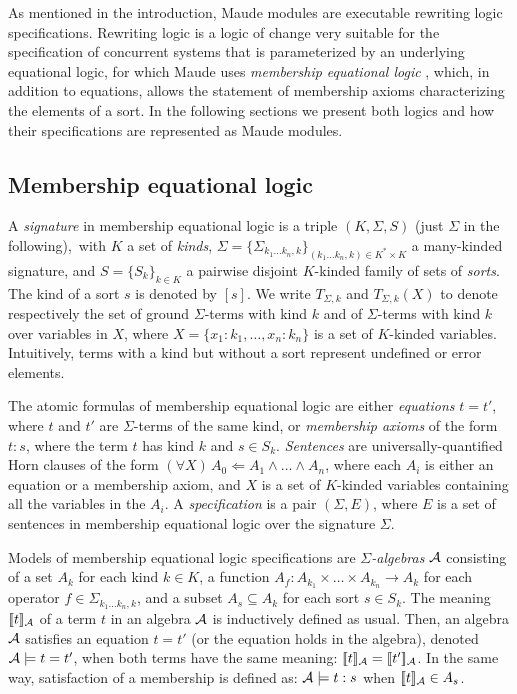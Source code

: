 
As mentioned in the introduction, Maude modules are executable rewriting logic specifications.
Rewriting logic \cite{Meseguer92-tcs} is a logic of change very suitable
for the specification of concurrent systems that is parameterized
by an underlying equational logic, for which Maude uses \emph{membership
equational logic} \cite{BouhoulaJouannaudMeseguer00,Meseguer97},
which, in addition to equations, allows the statement of membership
axioms characterizing the elements of a sort. In the following sections we
present both logics and how their specifications are represented as Maude modules.

\subsection{Membership equational logic} \label{mel-section}

A \emph{signature} in membership equational logic is a triple $(K,\Sigma, S)$
(just $\Sigma$ in the following),\
with $K$ a set of {\em kinds},
$\Sigma = \{\Sigma_{k_1\ldots k_n,k}\}_{(k_1\ldots k_n,k)\in K^{*}\times K}$ a
many-kinded signature, and $S =
\{S_{k}\}_{k\in K}$ a pairwise disjoint $K$-kinded family of sets of
\emph{sorts}.
The kind of a sort $s$ is denoted by $[s]$.
We write $T_{\Sigma,k}$ and $T_{\Sigma,k}(X)$ to denote respectively the set
of ground
$\Sigma$-terms with kind $k$ and of $\Sigma$-terms with kind $k$ over variables
in $X$, where $X = \{ x_1:k_1, \dots, x_n:k_n\}$ is a set of $K$-kinded
variables.
Intuitively, terms with a kind but without a sort represent undefined or error
elements.

The atomic formulas of membership equational logic are either \emph{equations}
$t = t'$, where $t$ and $t'$ are $\Sigma$-terms of the same kind, or
\emph{membership axioms} of the form $t : s$, where the term $t$
has kind $k$ and $s \in S_k$.
\emph{Sentences} are universally-quantified Horn clauses of the
form $(\forall X)\, A_0 \Leftarrow A_1 \wedge \ldots \wedge A_n$,
where each $A_i$ is  either an equation or a membership axiom, and $X$ is a
set of $K$-kinded variables containing all the variables in the $A_i$.
A \emph{specification} is a pair $(\Sigma,E)$, where $E$ is a set
of sentences in membership equational logic over the signature $\Sigma$.

Models of membership equational logic specifications are
\emph{$\Sigma$-algebras} $\mathcal{A}$ consisting of a set $A_k$ for each kind $k \in K$,
a function $A_f : A_{k_1}\times \dots \times A_{k_n} \longrightarrow A_k$ for each 
operator $f \in \Sigma_{k_1 \dots k_n, k}$, and
a subset $A_s \subseteq A_k$ for each sort $s\in S_k$. The meaning
$[\![t]\!]_{\mathcal{A}}$ of a term $t$ in an algebra $\mathcal{A}$ is inductively defined as usual.
Then, an algebra $\mathcal{A}$ satisfies an equation $t = t'$  (or the equation holds
in the algebra), denoted $\mathcal{A} \models t = t'$, when both terms have the same meaning:
$[\![t]\!]_{\mathcal{A}} = [\![t']\!]_{\mathcal{A}}$. In the same way, satisfaction of a membership is defined as:
$\mathcal{A} \models t : s$ when $[\![t]\!]_{\mathcal{A}} \in A_s$.

